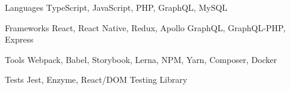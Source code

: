 

\begin{cvskills}

  \cvskill
    {Languages} %
    {TypeScript, JavaScript, PHP, GraphQL, MySQL} %

  \cvskill
    {Frameworks} %
    {React, React Native, Redux, Apollo GraphQL, GraphQL-PHP, Express} %

  \cvskill
    {Tools} %
    {Webpack, Babel, Storybook, Lerna, NPM, Yarn, Composer, Docker} %

  \cvskill
    {Tests} %
    {Jest, Enzyme, React/DOM Testing Library} %

\end{cvskills}

